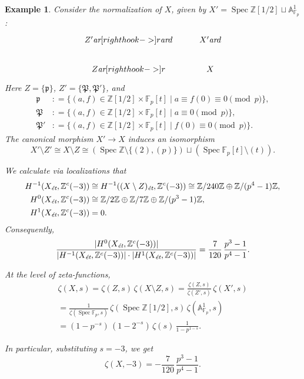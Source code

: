 \documentclass[draft]{article}
\DeclareMathOperator{\Spec}{Spec}
\newcommand{\FF}{\mathbb{F}}
\newcommand{\ZZ}{\mathbb{Z}}
\renewcommand{\AA}{\mathbb{A}}
\newcommand{\ar}{\text{\it ar}}
\newcommand{\et}{\text{\it \'{e}t}}
\newcommand{\dfn}{\mathrel{\mathop:}=}
\theoremstyle{myplain}
\theoremstyle{mydefinition}
\newtheorem{example}[theorem]{Example}
\begin{document}
\begin{example}
  Consider the normalization of $X$, given by
  $X' = \Spec \ZZ [1/2] \sqcup \AA^1_{\FF_p}$:
  \[ \begin{tikzcd}
      Z' \ar[right hook->]{r}\ar{d} & X' \ar{d} \\
      Z \ar[right hook->]{r} & X
    \end{tikzcd} \]
  Here $Z = \{ \mathfrak{p} \}$, $Z' = \{ \mathfrak{P}, \mathfrak{P}' \}$,
  and
  \begin{align*}
    \mathfrak{p} & \dfn \{ (a,f) \in \ZZ [1/2] \times \FF_p [t] \mid a \equiv f(0) \equiv 0 \pmod{p} \}, \\
    \mathfrak{P} & \dfn \{ (a,f) \in \ZZ [1/2] \times \FF_p [t] \mid a \equiv 0 \pmod{p} \}, \\
    \mathfrak{P}' & \dfn \{ (a,f) \in \ZZ [1/2] \times \FF_p [t] \mid f(0) \equiv 0 \pmod{p} \}.
  \end{align*}
  The canonical morphism $X' \to X$ induces an isomorphism
  \[ X'\setminus Z' \cong X\setminus Z \cong
    (\Spec \ZZ \setminus \{ (2), (p) \}) \sqcup
    (\Spec \FF_p [t] \setminus (t)). \]

  We calculate via localizations that
  \begin{align*}
    H^{-1} (X_\et, \ZZ^c (-3)) & \cong H^{-1} ((X\setminus Z)_\et, \ZZ^c (-3)) \cong
                                 \ZZ/240\ZZ \oplus \ZZ/(p^4 - 1)\ZZ, \\
    H^0 (X_\et, \ZZ^c (-3)) & \cong \ZZ/2\ZZ \oplus \ZZ/7\ZZ \oplus \ZZ/(p^3 - 1)\ZZ, \\
    H^1 (X_\et, \ZZ^c (-3)) & = 0.
  \end{align*}
  Consequently,
  \[ \frac{|H^0 (X_\et, \ZZ^c (-3))|}{|H^{-1} (X_\et, \ZZ^c (-3))|\cdot |H^1 (X_\et, \ZZ^c (-3))|} =
    \frac{7}{120}\,\frac{p^3-1}{p^4 - 1}. \]

  At the level of zeta-functions,
  \begin{multline*}
    \zeta (X,s) =
    \zeta (Z,s)\,\zeta (X\setminus Z,s) =
    \frac{\zeta (Z,s)}{\zeta (Z',s)}\,\zeta (X',s) \\
    = \frac{1}{\zeta (\Spec \FF_p,s)}\,\zeta (\Spec \ZZ[1/2],s)\,\zeta (\AA^1_{\FF_p},s) \\
    = (1-p^{-s})\,(1 - 2^{-s})\,\zeta (s)\,\frac{1}{1 - p^{1-s}}.
  \end{multline*}

  In particular, substituting $s = -3$, we get
  $$\zeta (X,-3) = -\frac{7}{120}\,\frac{p^3 - 1}{p^4 - 1}.$$
\end{example}


\pagebreak


\end{document}
